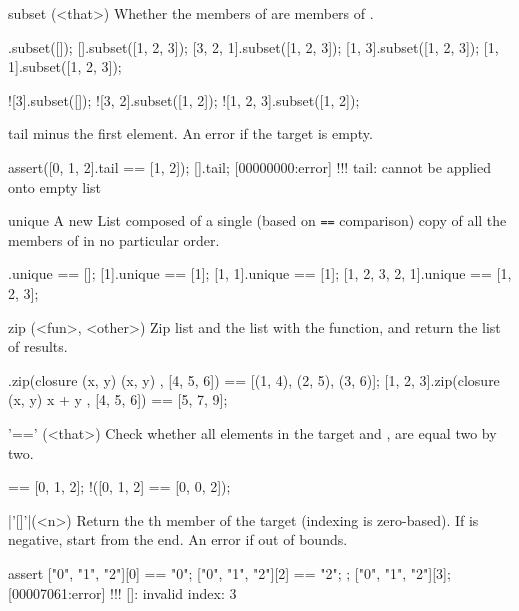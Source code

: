 \begin{urbiscriptapi}
\item[subset](<that>)%
  Whether the members of \this are members of .

\begin{urbiassert}
        [].subset([]);
        [].subset([1, 2, 3]);
 [3, 2, 1].subset([1, 2, 3]);
    [1, 3].subset([1, 2, 3]);
    [1, 1].subset([1, 2, 3]);

      ![3].subset([]);
   ![3, 2].subset([1, 2]);
![1, 2, 3].subset([1, 2]);
\end{urbiassert}


\item[tail]%
  \this minus the first element. An error if the target is empty.
\begin{urbiscript}
assert([0, 1, 2].tail == [1, 2]);
[].tail;
[00000000:error] !!! tail: cannot be applied onto empty list
\end{urbiscript}


\item[unique]%
  A new List composed of a single (based on \lstinline|==| comparison) copy
  of all the members of \this in no particular order.
\begin{urbiassert}
             [].unique == [];
            [1].unique == [1];
         [1, 1].unique == [1];
[1, 2, 3, 2, 1].unique == [1, 2, 3];
\end{urbiassert}


\item[zip](<fun>, <other>)%
  Zip \this list and the  list with the  function, and
  return the list of results.

\begin{urbiassert}
[1, 2, 3].zip(closure (x, y) { (x, y) }, [4, 5, 6])
       == [(1, 4), (2, 5), (3, 6)];
[1, 2, 3].zip(closure (x, y) { x + y }, [4, 5, 6])
       == [5, 7, 9];
\end{urbiassert}

\item['=='](<that>)%
Check whether all elements in the target and , are
equal two by two.

\begin{urbiassert}
[0, 1, 2] == [0, 1, 2];
!([0, 1, 2] == [0, 0, 2]);
\end{urbiassert}

\item|'[]'|(<n>)%
  Return the th member of the target (indexing is
  zero-based). If  is negative, start from the end.  An error
  if out of bounds.

\begin{urbiscript}
assert
{
  ["0", "1", "2"][0] == "0";
  ["0", "1", "2"][2] == "2";
};
["0", "1", "2"][3];
[00007061:error] !!! []: invalid index: 3


\end{urbiscript}
\end{urbiscriptapi}
